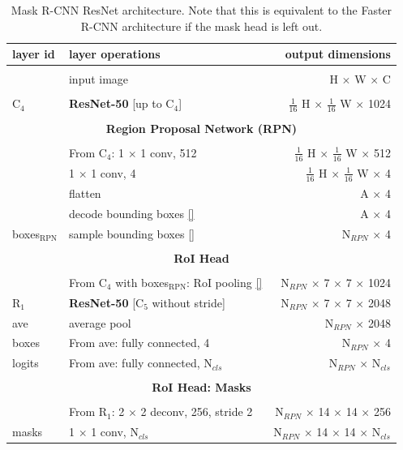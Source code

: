 {
\begin{table}[h]
\centering
\begin{tabular}{llr}
layer id & layer operations & output dimensions \\
\toprule \\
& input image & H $\times$ W $\times$ C \\
\midrule \\
C$_4$ & \textbf{ResNet-50} [up to C$_4$] & $\tfrac{1}{16}$ H $\times$ $\tfrac{1}{16}$ W $\times$ 1024 \\
\midrule \\
\multicolumn{3}{c}{\textbf{Region Proposal Network (RPN)}}\\
\midrule \\
& From C$_4$: 1 $\times$ 1 conv, 512 & $\tfrac{1}{16}$ H $\times$ $\tfrac{1}{16}$ W $\times$ 512 \\
& 1 $\times$ 1 conv, 4 & $\tfrac{1}{16}$ H $\times$ $\tfrac{1}{16}$ W $\times$ 4 \\
& flatten & A $\times$ 4 \\
 & decode bounding boxes \ref{} & A $\times$ 4 \\
boxes$_{\mathrm{RPN}}$ & sample bounding boxes \ref{} & N$_{RPN}$ $\times$ 4 \\
\midrule \\
\multicolumn{3}{c}{\textbf{RoI Head}}\\
\midrule \\
& From C$_4$ with boxes$_{\mathrm{RPN}}$: RoI pooling \ref{} & N$_{RPN}$ $\times$ 7 $\times$ 7 $\times$ 1024 \\
R$_1$& \textbf{ResNet-50} [C$_5$ without stride] & N$_{RPN}$ $\times$ 7 $\times$ 7 $\times$ 2048 \\
ave & average pool & N$_{RPN}$ $\times$ 2048 \\
boxes& From ave: fully connected, 4 & N$_{RPN}$ $\times$ 4 \\
logits& From ave: fully connected, N$_{cls}$ & N$_{RPN}$ $\times$ N$_{cls}$ \\
\midrule \\
\multicolumn{3}{c}{\textbf{RoI Head: Masks}}\\
\midrule \\
& From R$_1$: 2 $\times$ 2 deconv, 256, stride 2 & N$_{RPN}$ $\times$ 14 $\times$ 14 $\times$ 256 \\
masks & 1 $\times$ 1 conv, N$_{cls}$ & N$_{RPN}$ $\times$ 14 $\times$ 14 $\times$ N$_{cls}$ \\

\bottomrule
\end{tabular}

\caption {
Mask R-CNN \cite{MaskRCNN} ResNet \cite{ResNet} architecture.
Note that this is equivalent to the Faster R-CNN architecture if the mask
head is left out.
}
\label{table:maskrcnn_resnet}
\end{table}
}

